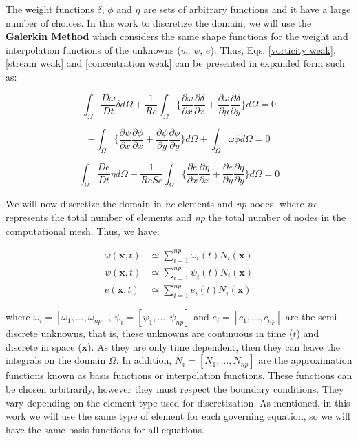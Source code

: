 The weight functions $\delta$, $\phi$ and $\eta$ 
are sets of arbitrary functions and it have a large number of choices. 
In this work to discretize the domain, we will use the 
\textbf{Galerkin Method} which considers the same shape functions 
for the weight and interpolation functions of the unknowns 
($w$, $\psi$, $e$). 
Thus, Eqs. \ref{vorticity weak}, \ref{stream weak} and
 \ref{concentration weak} 
can be presented in expanded form such as:

\begin{equation} 
   \int_{\Omega} \frac{D \omega}{Dt} \delta d\Omega 
 + \frac{1}{\textit{Re}} \int_{\Omega} \Bigg\{ \frac{\partial \omega}{\partial x} \frac{\partial \delta}{\partial x} 
 + \frac{\partial \omega}{\partial y} \frac{\partial \delta}{\partial y} \Bigg\} d\Omega 
 = 0
\end{equation}

\begin{equation}
 - \int_{\Omega} \Bigg\{ \frac{\partial \psi}{\partial x} \frac{\partial \phi}{\partial x} 
 + \frac{\partial \psi}{\partial y} \frac{\partial \phi}{\partial y} \Bigg\} d\Omega
 + \int_{\Omega} \omega \phi d\Omega = 0
\end{equation}

\begin{equation} 
   \int_{\Omega} \frac{D e}{Dt} \eta d\Omega 
 + \frac{1}{\textit{ReSc}} \int_{\Omega} \Bigg\{ \frac{\partial e}{\partial x} \frac{\partial \eta}{\partial x} 
 + \frac{\partial e}{\partial y} \frac{\partial \eta}{\partial y} \Bigg\} d\Omega
 = 0
\end{equation}

\medskip
We will now discretize the domain in \textit{ne} elements and 
\textit{np} nodes, where \textit{ne} represents the total number 
of elements and \textit{np} the total number of nodes 
in the computational mesh. Thus, we have:

\begin{align}
 \omega(\textbf{x},t) & \simeq \sum\limits_{i=1}^{np} \omega_i(t) N_i(\textbf{x}) \\
 \psi(\textbf{x},t) & \simeq \sum\limits_{i=1}^{np} \psi_i(t) N_i(\textbf{x}) \\
 e(\textbf{x},t) & \simeq \sum\limits_{i=1}^{np} e_i(t) N_i(\textbf{x})
\end{align}

\noindent
where 
$\omega_i = [\omega_1,...,\omega_{np}]$,
$\psi_i = [\psi_1,...,\psi_{np}]$ and
$e_i = [c_1,...,c_{np}]$ 
are the semi-discrete unknowns, that is, 
these unknowns are continuous in time ($t$)
and discrete in space ($\textbf{x}$). As they
are only time dependent, then 
they can leave the integrals on the domain 
$\Omega$. In addition, $N_i = [N_1, ..., N_{np}]$ 
are the approximation functions known 
as basis functions or interpolation functions. 
These functions can be chosen arbitrarily, however they 
must respect the boundary conditions. 
They vary depending on the element type used for discretization. 
As mentioned, in this work we will use the same type of element 
for each governing equation, 
so we will have the same basis functions for all equations.


